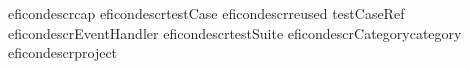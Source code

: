 \begin{gdreficon}
  \app{}eficondescr{\gdstep}{cap}
  \app{}eficondescr{\gdcase}{testCase}
  \app{}eficondescr{reused \gdcase}{testCaseRef}
  \app{}eficondescr{\gdehandler}{EventHandler}
  \app{}eficondescr{\gdsuite}{testSuite}
  \app{}eficondescr{Category}{category}
  \app{}eficondescr{\gdproject}{project}
\end{gdreficon}












